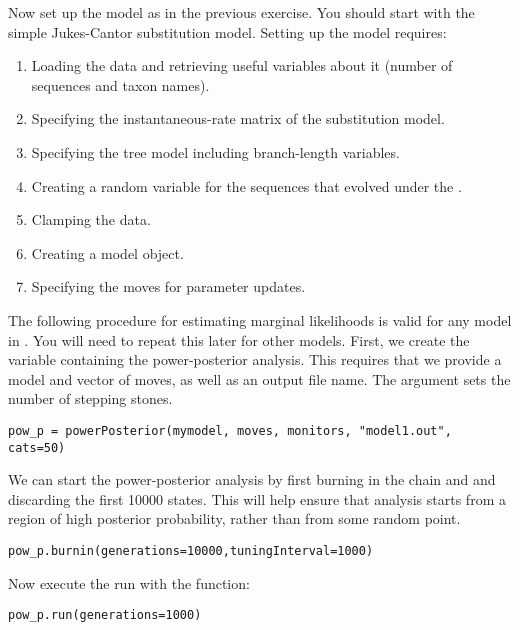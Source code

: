 Now set up the model as in the previous exercise. You should start with the simple Jukes-Cantor substitution model. 
Setting up the model requires:
\begin{enumerate}
\item Loading the data and retrieving useful variables about it (\EG number of sequences and taxon names).
\item Specifying the instantaneous-rate matrix of the substitution model.
\item Specifying the tree model including branch-length variables.
\item Creating a random variable for the sequences that evolved under the .
\item Clamping the data.
\item Creating a model object.
\item Specifying the moves for parameter updates.
\end{enumerate}

The following procedure for estimating marginal likelihoods is valid for any model in \RevBayes.
You will need to repeat this later for other models.
First, we create the variable containing the power-posterior analysis. 
This requires that we provide a model and vector of moves, as well as an output file name. 
The  argument sets the number of stepping stones.
{\tt \begin{snugshade*}
\begin{lstlisting}
pow_p = powerPosterior(mymodel, moves, monitors, "model1.out", cats=50) 
\end{lstlisting}
\end{snugshade*}}

We can start the power-posterior analysis by first burning in the chain and and discarding the first 10000 states.  
This will help ensure that analysis starts from a region of high posterior probability, rather than from some random point.
{\tt \begin{snugshade*}
\begin{lstlisting}
pow_p.burnin(generations=10000,tuningInterval=1000)
\end{lstlisting}
\end{snugshade*}}

Now execute the run with the  function:
{\tt \begin{snugshade*}
\begin{lstlisting}
pow_p.run(generations=1000)  
\end{lstlisting}
\end{snugshade*}}

